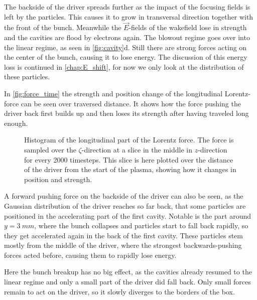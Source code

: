 \documentclass[bachelor_thesis]{subfiles}
\begin{document}
The backside of the driver spreads further as the impact of the focusing fields is left by the particles. This causes it to grow in transversal direction together with the front of the bunch. 
Meanwhile the $\vec{E}$-fields of the wakefield lose in strength and the cavities are flood by electrons again. The blowout regime goes over into the linear regime, as seen in \autoref{fig:cavity}d.
Still there are strong forces acting on the center of the bunch, causing it to lose energy. The discussion of this energy loss is continued in \autoref{chap:E_shift}, for now we only look at the distribution of these particles.

In \autoref{fig:force_time} the strength and position change of the longitudinal Lorentz-force can be seen over traversed distance. It shows how the force pushing the driver back first builds up and then loses its strength after having traveled long enough.
\begin{figure}
	\centering
	\missingfigure{}
	\caption{Histogram of the longitudinal part of the Lorentz force. The force is sampled over the $\zeta$-direction at a slice in the middle in $z$-direction for every 2000 timesteps. This slice is here plotted over the distance of the driver from the start of the plasma, showing how it changes in position and strength.}
	\label{fig:force_time}
\end{figure}
A forward pushing force on the backside of the driver can also be seen, as the Gaussian distribution of the driver reaches so far back, that some particles are positioned in the accelerating part of the first cavity.
Notable is the part around $y=\qty{3}{mm}$, where the bunch collapses and particles start to fall back rapidly, so they get accelerated again in the back of the first cavity. These particles stem mostly from the middle of the driver,
where the strongest backwards-pushing forces acted before, causing them to rapidly lose energy. 

Here the bunch breakup has no big effect, as the cavities already resumed to the linear regime and only a small part of the driver did fall back. Only small forces remain to act on the driver, so it slowly diverges to the borders of the box.
\end{document}
